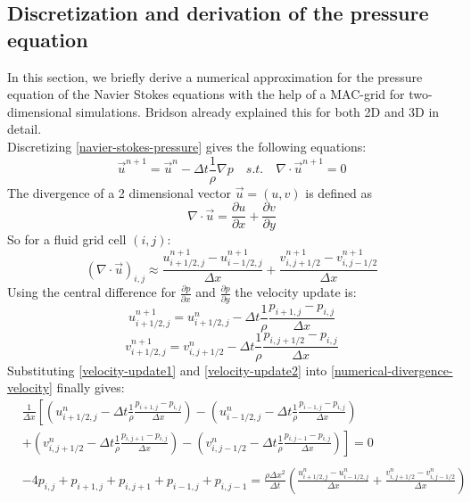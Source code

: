 \subsection{Discretization and derivation of the pressure equation}
In this section, we briefly derive a numerical approximation for the pressure equation of the Navier Stokes equations with the help of a MAC-grid for two-dimensional simulations. Bridson \parencite{bridson2015fluid} \parencite{bridson2007fluid} already explained this for both 2D and 3D in detail.\\
Discretizing \ref{navier-stokes-pressure} gives the following equations:
\begin{equation} \label{navier-stokes-pressure-numerical1}
    \vec{u}^{n+1} = \vec{u}^{n} - \Delta t \frac{1}{\rho} \nabla p \quad s.t. \quad \nabla \cdot \vec{u}^{n+1} = 0
\end{equation}
The divergence of a 2 dimensional vector $\vec{u} = (u, v)$ is defined as
\begin{equation} \label{general-divergence}
    \nabla \cdot \vec{u} = \frac{\partial u}{\partial x} + \frac{\partial v}{\partial y}
\end{equation}
So for a fluid grid cell $(i, j)$:
\begin{equation} \label{numerical-divergence-velocity}
    (\nabla \cdot \vec{u})_{i,j} \approx \frac{u_{i+1/2,j}^{n+1} - u_{i-1/2,j}^{n+1}}{\Delta x} + \frac{v_{i,j+1/2}^{n+1} - v_{i,j-1/2}^{n+1}}{\Delta x}
\end{equation}
Using the central difference for $\frac{\partial p}{\partial x}$ and $\frac{\partial p}{\partial y}$ the velocity update is:
\begin{equation} \label{velocity-update1}
    u_{i+1/2,j}^{n+1} = u_{i+1/2,j}^{n} - \Delta t \frac{1}{\rho} \frac{p_{i+1,j} - p_{i,j}}{\Delta x}
\end{equation}
\begin{equation} \label{velocity-update2}
v_{i+1/2,j}^{n+1} = v_{i,j+1/2}^{n} - \Delta t \frac{1}{\rho} \frac{p_{i,j+1/2} - p_{i,j}}{\Delta x}
\end{equation}
Substituting \ref{velocity-update1} and \ref{velocity-update2} into \ref{numerical-divergence-velocity} finally gives:
\begin{equation} \label{pressure-equation}
    \begin{aligned}
        & \frac{1}{\Delta x}\left[\left(u_{i+1/2,j}^{n} - \Delta t \frac{1}{\rho} \frac{p_{i+1,j} - p_{i,j}}{\Delta x}\right) - \left(u_{i-1/2,j}^{n} - \Delta t \frac{1}{\rho} \frac{p_{i-1,j} - p_{i,j}}{\Delta x}\right) \right. \\
        & + \left. \left(v_{i,j+1/2}^{n} - \Delta t \frac{1}{\rho} \frac{p_{i,j+1} - p_{i,j}}{\Delta x}\right) - \left(v_{i,j-1/2}^{n} - \Delta t \frac{1}{\rho} \frac{p_{i,j-1} - p_{i,j}}{\Delta x} \right) \right] = 0 \\\\
        &  - 4p_{i,j} + p_{i+1,j} + p_{i,j+1} + p_{i-1,j} + p_{i,j-1} = \frac{\rho \Delta x^2}{\Delta t} \left( \frac{u_{i+1/2,j}^{n} - u_{i-1/2,j}^{n}}{\Delta x} + \frac{v_{i,j+1/2}^{n} - v_{i,j-1/2}^{n}}{\Delta x} \right)
\end{aligned}
\end{equation}
